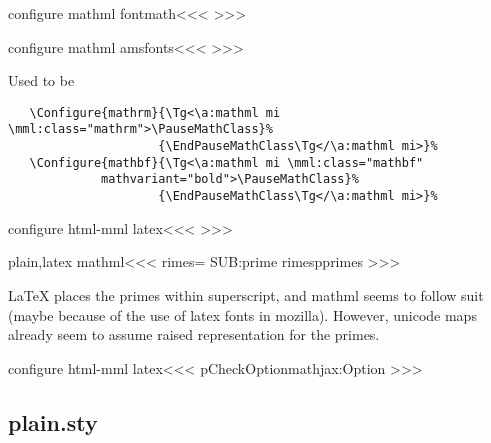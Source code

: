 {{{{{{\<configure mathml fontmath\><<<
>>>

\<configure mathml amsfonts\><<<  
>>>



Used to be

\begin{verbatim}
   \Configure{mathrm}{\Tg<\a:mathml mi \mml:class="mathrm">\PauseMathClass}%
                     {\EndPauseMathClass\Tg</\a:mathml mi>}%
   \Configure{mathbf}{\Tg<\a:mathml mi \mml:class="mathbf"                
             mathvariant="bold">\PauseMathClass}%
                     {\EndPauseMathClass\Tg</\a:mathml mi>}%
\end{verbatim}


\<configure html-mml latex\><<<
>>>





\<plain,latex mathml\><<<
   {\let\:primes=\empty}
   {\relax \csname SUB:prime\endcsname{}%
   }
   {\let\prime=\relax \xdef\:primes{\:primes\prime}}
>>>

LaTeX places the primes within superscript, and mathml seems to follow
suit (maybe because of the use of latex fonts in mozilla). However,
unicode maps already seem to assume raised representation for the
primes.


\<configure html-mml latex\><<<
\:CheckOption{mathjax}\if:Option
\fi
>>>

\subsection{plain.sty}




}}}}}}
